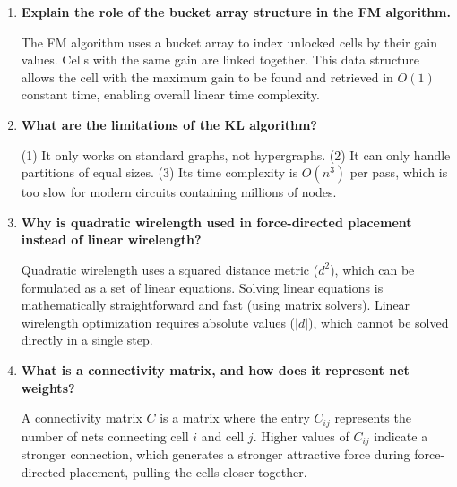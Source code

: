 \documentclass[12pt,a4paper]{article}
\newcommand{\Q}[1]{\textbf{#1}\par\noindent\ignorespaces}
\begin{document}
\begin{tcolorbox}[exambox, title={\textbf{Frequently Asked / Viva Questions}}]
\begin{enumerate}[leftmargin=*, topsep=0pt, label=\textbf{Q\arabic*.}, itemsep=6pt]
  \item \Q{Explain the role of the bucket array structure in the FM algorithm.}
        The FM algorithm uses a bucket array to index unlocked cells by their gain values. Cells with the same gain are linked together. This data structure allows the cell with the maximum gain to be found and retrieved in $O(1)$ constant time, enabling overall linear time complexity.
        
  \item \Q{What are the limitations of the KL algorithm?}
        (1) It only works on standard graphs, not hypergraphs. (2) It can only handle partitions of equal sizes. (3) Its time complexity is $O(n^3)$ per pass, which is too slow for modern circuits containing millions of nodes.
        
  \item \Q{Why is quadratic wirelength used in force-directed placement instead of linear wirelength?}
        Quadratic wirelength uses a squared distance metric ($d^2$), which can be formulated as a set of linear equations. Solving linear equations is mathematically straightforward and fast (using matrix solvers). Linear wirelength optimization requires absolute values ($|d|$), which cannot be solved directly in a single step.
        
  \item \Q{What is a connectivity matrix, and how does it represent net weights?}
        A connectivity matrix $C$ is a matrix where the entry $C_{ij}$ represents the number of nets connecting cell $i$ and cell $j$. Higher values of $C_{ij}$ indicate a stronger connection, which generates a stronger attractive force during force-directed placement, pulling the cells closer together.
\end{enumerate}
\end{tcolorbox}

\vspace{6pt}
\end{document}
